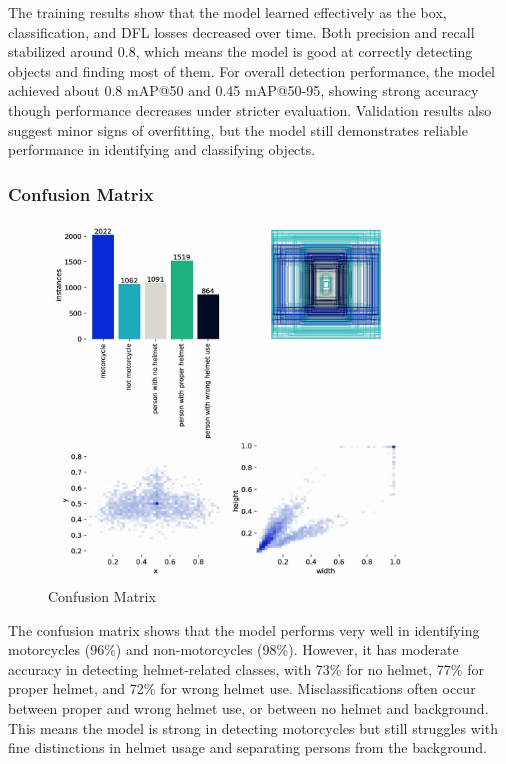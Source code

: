 \begin{refsection}
\begin{refsection}
\noindent
The training results show that the model learned effectively as the box, classification, and DFL losses decreased over time. Both precision and recall stabilized around 0.8, which means the model is good at correctly detecting objects and finding most of them. For overall detection performance, the model achieved about 0.8 mAP@50 and 0.45 mAP@50-95, showing strong accuracy though performance decreases under stricter evaluation. Validation results also suggest minor signs of overfitting, but the model still demonstrates reliable performance in identifying and classifying objects.

\subsubsection{Confusion Matrix}
\begin{figure}[ht]
    \centering
	\includegraphics[width=0.85\textwidth]{figures/Fig 16.jpg}
	\caption[Confusion Matrix]{Confusion Matrix}
	\label{fig:confusion_matrix}
\end{figure}

\noindent
The confusion matrix shows that the model performs very well in identifying motorcycles (96\%) and non-motorcycles (98\%). However, it has moderate accuracy in detecting helmet-related classes, with 73\% for no helmet, 77\% for proper helmet, and 72\% for wrong helmet use. Misclassifications often occur between proper and wrong helmet use, or between no helmet and background. This means the model is strong in detecting motorcycles but still struggles with fine distinctions in helmet usage and separating persons from the background.


\end{refsection}
\end{refsection}
